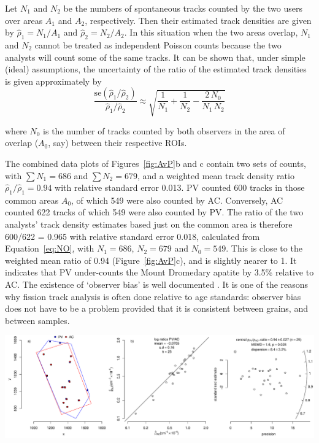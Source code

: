 \documentclass[gchron, manuscript]{copernicus}
\begin{document}
Let $N_1$ and $N_2$ be the numbers of spontaneous tracks counted by
the two users over areas $A_1$ and $A_2$, respectively. Then their
estimated track densities are given by $\hat{\rho}_1 = N_1/A_1$ and
$\hat{\rho}_2 = N_2/A_2$. In this situation when the two areas
overlap, $N_1$ and $N_2$ cannot be treated as independent Poisson
counts because the two analysts will count some of the same tracks. It
can be shown that, under simple (ideal) assumptions, the uncertainty
of the ratio of the estimated track densities is given approximately
by
\begin{equation}
  \frac{\mbox{se}(\hat{\rho}_1/\hat{\rho}_2)}{\hat{\rho}_1/\hat{\rho}_2} \approx
  \sqrt{ \frac{1}{N_1} + \frac{1}{N_2} - \frac{2\,N_0}{N_1\,N_2} }
  \label{eq:NO}
\end{equation}

\noindent where $N_0$ is the number of tracks counted by both
observers in the area of overlap ($A_0$, say) between their respective
ROIs.\medskip 

The combined data plots of Figures~\ref{fig:AvP}b and c contain two
sets of counts, with $\sum N_{1} = 686$ and $\sum N_{2} = 679$, and a
weighted mean track density ratio $\hat{\rho}_{1}/\hat{\rho}_{1} =
0.94$ with relative standard error 0.013. PV counted 600 tracks in
those common areas $A_0$, of which 549 were also counted by
AC. Conversely, AC counted 622 tracks of which 549 were also counted
by PV. The ratio of the two analysts' track density estimates based
just on the common area is therefore 600/622 = 0.965 with relative
standard error 0.018, calculated from Equation~\ref{eq:NO}, with $N_1
= 686$, $N_2 = 679$ and $N_0 = 549$.  This is close to the weighted
mean ratio of 0.94 (Figure~\ref{fig:AvP}c), and is slightly nearer to
1. It indicates that PV under-counts the Mount Dromedary apatite by
3.5\% relative to AC.  The existence of `observer bias' is well
documented \citep{tamer2025}.  It is one of the reasons why fission
track analysis is often done relative to age standards: observer bias
does not have to be a problem provided that it is consistent between
grains, and between samples.\medskip

{ \centering \includegraphics[width=\linewidth]{AvP.pdf}
  \label{fig:AvP}
}%
\end{document}

